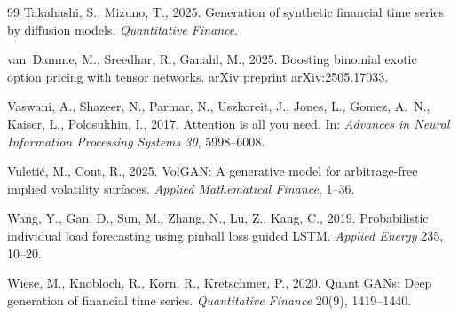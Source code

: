 ﻿\documentclass[12pt,letterpaper]{article}
\begin{document}
\begin{thebibliography}{99}
Takahashi, S., Mizuno, T., 2025. Generation of synthetic financial time
series by diffusion models. \emph{Quantitative Finance}.

van~Damme, M., Sreedhar, R., Ganahl, M., 2025. Boosting binomial exotic
option pricing with tensor networks. arXiv preprint arXiv:2505.17033.

Vaswani, A., Shazeer, N., Parmar, N., Uszkoreit, J., Jones, L., Gomez,
A.~N., Kaiser, {\L}., Polosukhin, I., 2017. Attention is all you need. In:
\emph{Advances in Neural Information Processing Systems 30}, 5998--6008.

Vuleti\'c, M., Cont, R., 2025. VolGAN: A generative model for
arbitrage-free implied volatility surfaces. \emph{Applied Mathematical
Finance}, 1--36.

Wang, Y., Gan, D., Sun, M., Zhang, N., Lu, Z., Kang, C., 2019.
Probabilistic individual load forecasting using pinball loss guided LSTM.
\emph{Applied Energy} 235, 10--20.

Wiese, M., Knobloch, R., Korn, R., Kretschmer, P., 2020. Quant GANs: Deep
generation of financial time series. \emph{Quantitative Finance} 20(9),
1419--1440.

\end{thebibliography}
\end{document}
